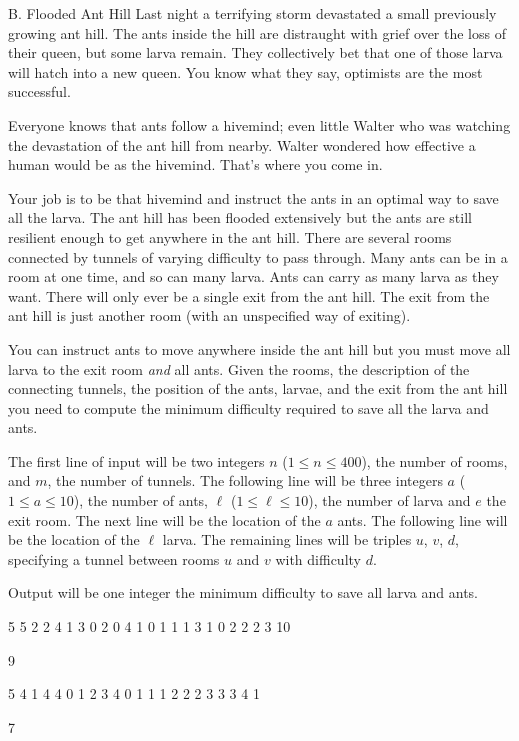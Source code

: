 \begin{problem}{B. Flooded Ant Hill}
Last night a terrifying storm devastated a small previously growing ant hill.
The ants inside the hill are distraught with grief over the loss of their queen, but some larva remain.
They collectively bet that one of those larva will hatch into a new queen.
You know what they say, optimists are the most successful.

Everyone knows that ants follow a hivemind; even little Walter who was watching the devastation of the ant hill from nearby.
Walter wondered how effective a human would be as the hivemind.
That's where you come in.

Your job is to be that hivemind and instruct the ants in an optimal way to save all the larva.
The ant hill has been flooded extensively but the ants are still resilient enough to get anywhere in the ant hill.
There are several rooms connected by tunnels of varying difficulty to pass through.
Many ants can be in a room at one time, and so can many larva.
Ants can carry as many larva as they want.
There will only ever be a single exit from the ant hill.
The exit from the ant hill is just another room (with an unspecified way of exiting).

You can instruct ants to move anywhere inside the ant hill but you must move all larva to the exit room \textit{and} all ants.
Given the rooms, the description of the connecting tunnels, the position of the ants, larvae, and the exit from the ant hill you need to compute the minimum difficulty required to save all the larva and ants.
\end{problem}

\begin{formalin}
The first line of input will be two integers $n$ ($1 \leq n \leq 400$), the number of rooms, and $m$, the number of tunnels.
The following line will be three integers $a$ ($1 \leq a \leq 10$), the number of ants, $\ell$ ($1 \leq \ell \leq 10$), the number of larva and $e$ the exit room.
The next line will be the location of the $a$ ants.
The following line will be the location of the $\ell$ larva.
The remaining lines will be triples $u$, $v$, $d$, specifying a tunnel between rooms $u$ and $v$ with difficulty $d$.
\end{formalin}

\begin{formalout}
Output will be one integer the minimum difficulty to save all larva and ants.
\end{formalout}

\begin{datain}
5 5
2 2 4
1 3
0 2
0 4 1
0 1 1
1 3 1
0 2 2
2 3 10
\end{datain}
\begin{dataout}
9
\end{dataout}
\begin{datain}
5 4
1 4 4
0
1 2 3 4
0 1 1
1 2 2
2 3 3
3 4 1
\end{datain}
\begin{dataout}
7
\end{dataout}
